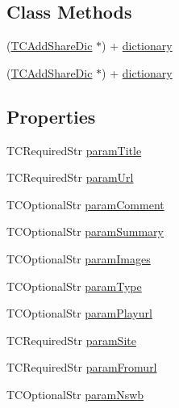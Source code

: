 \subsection*{Class Methods}
\begin{DoxyCompactItemize}
\item 
(\mbox{\hyperlink{interface_t_c_add_share_dic}{T\+C\+Add\+Share\+Dic}} $\ast$) + \mbox{\hyperlink{interface_t_c_add_share_dic_a42a05258af41808f8cfe4a987e73b3d3}{dictionary}}
\item 
(\mbox{\hyperlink{interface_t_c_add_share_dic}{T\+C\+Add\+Share\+Dic}} $\ast$) + \mbox{\hyperlink{interface_t_c_add_share_dic_a42a05258af41808f8cfe4a987e73b3d3}{dictionary}}
\end{DoxyCompactItemize}
\subsection*{Properties}
\begin{DoxyCompactItemize}
\item 
T\+C\+Required\+Str \mbox{\hyperlink{interface_t_c_add_share_dic_a08690a6b71a79cb89f87314c351e1a9b}{param\+Title}}
\item 
T\+C\+Required\+Str \mbox{\hyperlink{interface_t_c_add_share_dic_ade3c27392e2162022b8037970c324b55}{param\+Url}}
\item 
T\+C\+Optional\+Str \mbox{\hyperlink{interface_t_c_add_share_dic_a6fc2638fd9c8ab98e57f0d4e3363f891}{param\+Comment}}
\item 
T\+C\+Optional\+Str \mbox{\hyperlink{interface_t_c_add_share_dic_aca4c9dc69ee72f88297c95092a7dde7c}{param\+Summary}}
\item 
T\+C\+Optional\+Str \mbox{\hyperlink{interface_t_c_add_share_dic_a858150aa72ebce6a5305ed43125ef259}{param\+Images}}
\item 
T\+C\+Optional\+Str \mbox{\hyperlink{interface_t_c_add_share_dic_ab4de1c7eaf51141b47b9fc303621c5f6}{param\+Type}}
\item 
T\+C\+Optional\+Str \mbox{\hyperlink{interface_t_c_add_share_dic_ade8e162927353b5168f67956e2170fc7}{param\+Playurl}}
\item 
T\+C\+Required\+Str \mbox{\hyperlink{interface_t_c_add_share_dic_a58697b331a6e2a0452c52d57857c9121}{param\+Site}}
\item 
T\+C\+Required\+Str \mbox{\hyperlink{interface_t_c_add_share_dic_a7db596e6cf4f4c88a4b11ab9d3a6cabe}{param\+Fromurl}}
\item 
T\+C\+Optional\+Str \mbox{\hyperlink{interface_t_c_add_share_dic_a7070ffd507ba7f46978a6ff2777a5388}{param\+Nswb}}
\end{DoxyCompactItemize}
